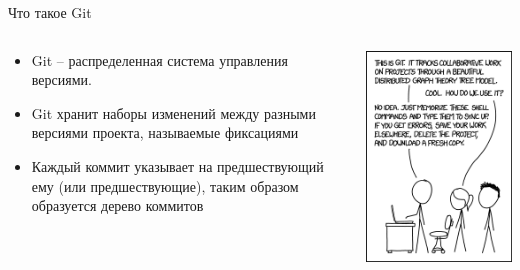 \begin{frame}{Что такое Git}
      \begin{columns}
            \begin{column}{0.6\textwidth}
                  \begin{itemize}
                        \item
                              Git -- распределенная система управления версиями.
                        \item
                              Git хранит наборы изменений между разными версиями проекта, называемые фиксациями
                        \item
                              Каждый коммит указывает на предшествующий ему (или предшествующие), таким образом образуется дерево коммитов
                    \end{itemize}
            \end{column}
            \begin{column}{0.4\textwidth}
                  \includegraphics[width=\textwidth,height=0.8\textheight,keepaspectratio]{images/memes/git.png}
            \end{column}
      \end{columns}    
\end{frame}